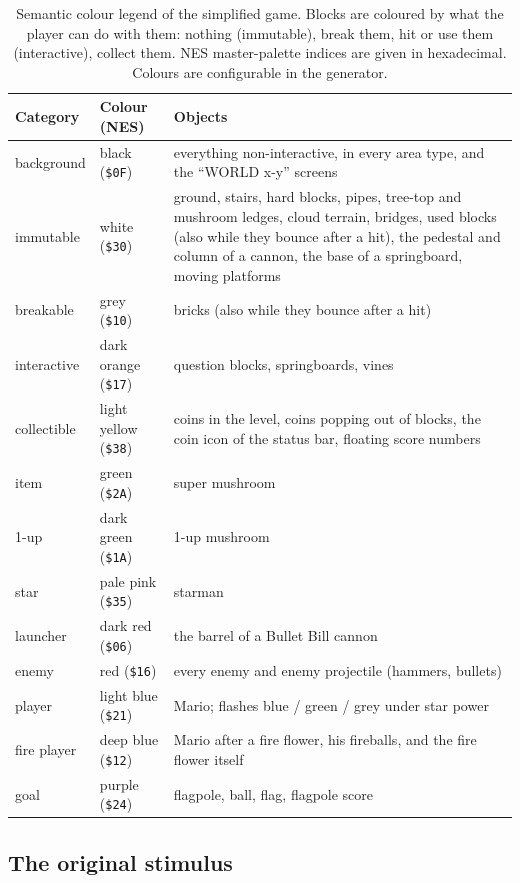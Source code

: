 \documentclass{article}
\newcommand{\hex}[1]{\texttt{\$#1}}
\begin{document}
\begin{table}[t]
  \caption{Semantic colour legend of the simplified game. Blocks are coloured by what the player
  can do with them: nothing (immutable), break them, hit or use them (interactive), collect them.
  NES master-palette indices are given in hexadecimal. Colours are configurable in the generator.}
  \centering
  \small
  \begin{tabular}{llp{9.2cm}}
    \toprule
    Category & Colour (NES) & Objects \\
    \midrule
    background & black (\hex{0F}) & everything non-interactive, in every area type, and the ``WORLD x-y'' screens \\
    immutable & white (\hex{30}) & ground, stairs, hard blocks, pipes, tree-top and mushroom ledges, cloud terrain, bridges, used blocks (also while they bounce after a hit), the pedestal and column of a cannon, the base of a springboard, moving platforms \\
    breakable & grey (\hex{10}) & bricks (also while they bounce after a hit) \\
    interactive & dark orange (\hex{17}) & question blocks, springboards, vines \\
    collectible & light yellow (\hex{38}) & coins in the level, coins popping out of blocks, the coin icon of the status bar, floating score numbers \\
    item & green (\hex{2A}) & super mushroom \\
    1-up & dark green (\hex{1A}) & 1-up mushroom \\
    star & pale pink (\hex{35}) & starman \\
    launcher & dark red (\hex{06}) & the barrel of a Bullet Bill cannon \\
    enemy & red (\hex{16}) & every enemy and enemy projectile (hammers, bullets) \\
    player & light blue (\hex{21}) & Mario; flashes blue / green / grey under star power \\
    fire player & deep blue (\hex{12}) & Mario after a fire flower, his fireballs, and the fire flower itself \\
    goal & purple (\hex{24}) & flagpole, ball, flag, flagpole score \\
    \bottomrule
  \end{tabular}
  \label{tab:legend}
\end{table}

\subsection{The original stimulus}
\label{sec:original}
\end{document}
